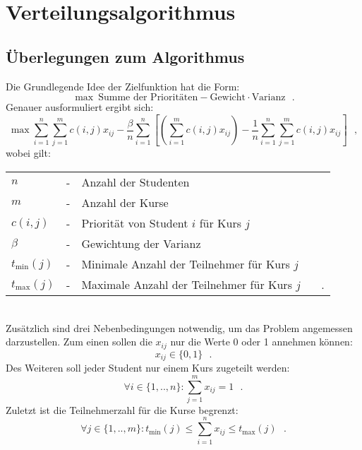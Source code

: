 \chapter{Verteilungsalgorithmus}
    \section{Überlegungen zum Algorithmus}
            Die Grundlegende Idee der Zielfunktion hat die Form:
                $$ \max ~\text{Summe der Prioritäten} - \text{Gewicht} \cdot \text{Varianz} ~~~.$$
            Genauer ausformuliert ergibt sich:
                $$ \max 
                    \sum_{i=1}^{n} \sum_{j=1}^{m} c(i,j)x_{ij} 
                    - \frac{\beta}{n} \sum_{i=1}^{n}
                        \left[\left(\sum_{i=1}^{m} c(i,j)x_{ij}\right) - \frac{1}{n} \sum_{i=1}^{n} \sum_{j=1}^{m} c(i,j)x_{ij}\right] ~~~,$$
            wobei gilt:\\
                \begin{tabular}{l c l}
                    $n$ & - & Anzahl der Studenten \\
                    $m$ & - & Anzahl der Kurse\\
                    $ c(i,j) $ & - & Priorität von Student $ i $ für Kurs $ j $\\
                    $ \beta $ & - & Gewichtung der Varianz\\
                    $t_{\min}(j)$ & - & Minimale Anzahl der Teilnehmer für Kurs $ j $\\
                    $t_{\max}(j)$ & - & Maximale Anzahl der Teilnehmer für Kurs $ j $ ~~~.\\
                \end{tabular}\\
            
            Zusätzlich sind drei Nebenbedingungen notwendig, um das Problem angemessen darzustellen.
            Zum einen sollen die $ x_{ij} $ nur die Werte 0 oder 1 annehmen können:
                $$ x_{ij} \in \{0,1\} ~~~.$$
            Des Weiteren soll jeder Student nur einem Kurs zugeteilt werden:
                $$ \forall {i \in \{1,..,n\}}: \sum_{j=1}^{m} x_{ij} = 1 ~~~.$$
            Zuletzt ist die Teilnehmerzahl für die Kurse begrenzt:
                $$ \forall {j \in \{1,..,m\}}: t_{\min}(j) \leq \sum_{i=1}^{n} x_{ij} \leq t_{\max}(j) ~~~.$$